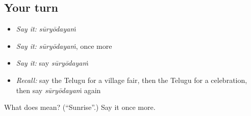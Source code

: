 \subsection*{Your turn}
\begin{itemize}
\raggedright
  \item \emph{Say it:} \emph{sūryōdayaṁ}
  \item \emph{Say it:} \emph{sūryōdayaṁ}, once more
  \item \emph{Say it:} say \emph{sūryōdayaṁ}
  \item \emph{Recall:} say the Telugu for a village fair, then the Telugu for a celebration, then say \emph{sūryōdayaṁ} again
\end{itemize}

\begin{tcolorbox}[breakable,colback=teal!4,colframe=teal!35!black,title={Before you move on}]
What does  mean? (\textquotedblleft{}Sunrise\textquotedblright{}.) Say it once more.
\end{tcolorbox}
